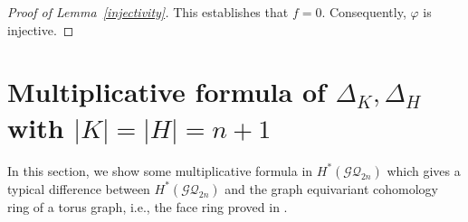\documentclass[12pt]{amsart}
\theoremstyle{remark}
\numberwithin{equation}{section}
\begin{document}
\begin{proof}[Proof of Lemma~\ref{injectivity}]
This establishes that $f=0$.
Consequently, $\varphi$ is injective.
\end{proof}

\section{Multiplicative formula of $\Delta_{K}, \Delta_{H}$ with $|K|=|H|=n+1$}
\label{sect:6}

In this section, we show some multiplicative formula in $H^{*}(\mathcal{GQ}_{2n})$ which gives a typical difference between $H^{*}(\mathcal{GQ}_{2n})$ and the graph equivariant cohomology ring of a torus graph, i.e., the face ring proved in \cite{MMP}.
\end{document}
